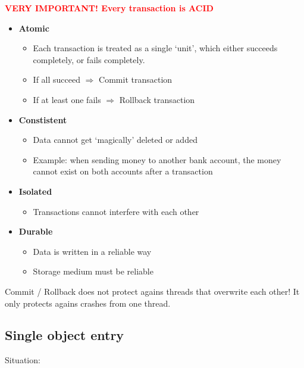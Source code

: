 \documentclass{article}
\begin{document}
\textcolor{red}{\textbf{VERY IMPORTANT! Every transaction is ACID}}

\begin{itemize}
    \item \textbf{Atomic}
    \begin{itemize}
        \item Each transaction is treated as a single `unit', which either succeeds completely, or fails completely.
        \item If all succeed $\Rightarrow$ Commit transaction
        \item If at least one fails $\Rightarrow$ Rollback transaction
    \end{itemize}
    \item \textbf{Constistent}
    \begin{itemize}
        \item Data cannot get `magically' deleted or added
        \item Example: when sending money to another bank account, the money cannot exist on both accounts after a transaction
    \end{itemize}
    \item \textbf{Isolated}
    \begin{itemize}
        \item Transactions cannot interfere with each other
    \end{itemize}
    \item \textbf{Durable}
    \begin{itemize}
        \item Data is written in a reliable way 
        \item Storage medium must be reliable
    \end{itemize}
\end{itemize}

Commit / Rollback does not protect agains threads that overwrite each other!
It only protects agains crashes from one thread.

\subsection{Single object entry}

Situation: 
\end{document}
